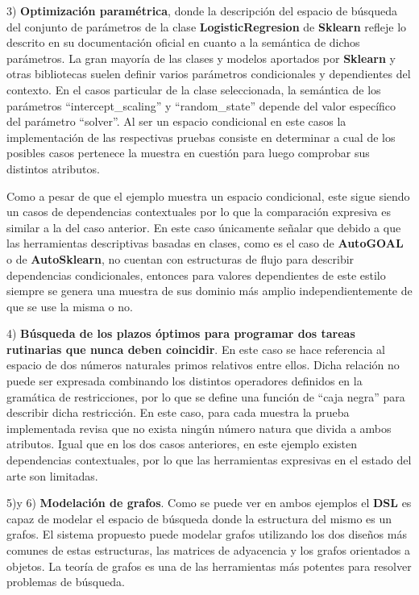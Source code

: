 3) {\bf Optimización paramétrica}, donde la descripción del espacio de búsqueda del conjunto de parámetros de la clase
      {\bf LogisticRegresion} de {\bf Sklearn} refleje lo descrito en su documentación oficial en cuanto a la semántica de dichos
parámetros. La gran mayoría de las clases y modelos aportados por {\bf Sklearn} y otras bibliotecas suelen definir varios
parámetros condicionales y dependientes del contexto. En el casos particular de la clase seleccionada, la semántica
de los parámetros ``intercept_scaling'' y ``random_state'' depende del valor específico del parámetro ``solver''. Al ser
un espacio condicional en este casos la implementación de las respectivas pruebas consiste en determinar a cual de
los posibles casos pertenece la muestra en cuestión para luego comprobar sus distintos atributos.

Como a pesar de que el ejemplo muestra un espacio condicional, este sigue siendo un casos de dependencias contextuales
por lo que la comparación expresiva es similar a la del caso anterior. En este caso únicamente señalar que debido a que
las herramientas descriptivas basadas en clases, como es el caso de {\bf AutoGOAL} o de {\bf AutoSklearn}, no cuentan con estructuras
de flujo para describir dependencias condicionales, entonces para valores dependientes de este estilo siempre se genera
una muestra de sus dominio más amplio independientemente de que se use la misma o no.

4) {\bf Búsqueda de los plazos óptimos para programar dos tareas rutinarias que nunca deben coincidir}. En este caso se hace
referencia al espacio de dos números naturales primos relativos entre ellos. Dicha relación no puede ser expresada
combinando los distintos operadores definidos en la gramática de restricciones, por lo que se define una función de
``caja negra'' para describir dicha restricción. En este caso, para cada muestra la prueba implementada revisa que no
exista ningún número natura que divida a ambos atributos. Igual que en los dos casos anteriores, en este ejemplo existen
dependencias contextuales, por lo que las herramientas expresivas en el estado del arte son limitadas.

5)y 6) {\bf Modelación de grafos}. Como se puede ver en ambos ejemplos el {\bf DSL} es capaz de modelar el espacio de búsqueda donde
la estructura del mismo es un grafos. El sistema propuesto puede modelar grafos utilizando los dos diseños más comunes de
estas estructuras, las matrices de adyacencia y los grafos orientados a objetos. La teoría de grafos es una de las
herramientas más potentes para resolver problemas de búsqueda.

